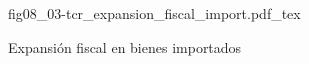 \begin{figure}[h]
\centering
\def\svgwidth{0.5\textwidth}
{fig08_03-tcr_expansion_fiscal_import.pdf_tex}
\caption{Expansión fiscal en bienes importados}
\label{fig08_03-tcr_expansion_fiscal_import}
\end{figure}